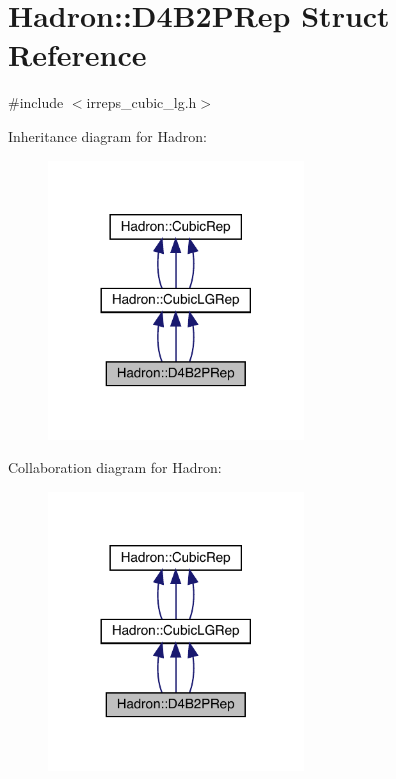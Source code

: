 \hypertarget{structHadron_1_1D4B2PRep}{}\section{Hadron\+:\+:D4\+B2\+P\+Rep Struct Reference}
\label{structHadron_1_1D4B2PRep}


{\ttfamily \#include $<$irreps\+\_\+cubic\+\_\+lg.\+h$>$}



Inheritance diagram for Hadron\+:
\nopagebreak
\begin{figure}[H]
\begin{center}
\leavevmode
\includegraphics[width=192pt]{d4/d23/structHadron_1_1D4B2PRep__inherit__graph}
\end{center}
\end{figure}


Collaboration diagram for Hadron\+:
\nopagebreak
\begin{figure}[H]
\begin{center}
\leavevmode
\includegraphics[width=192pt]{d0/d2d/structHadron_1_1D4B2PRep__coll__graph}
\end{center}
\end{figure}

